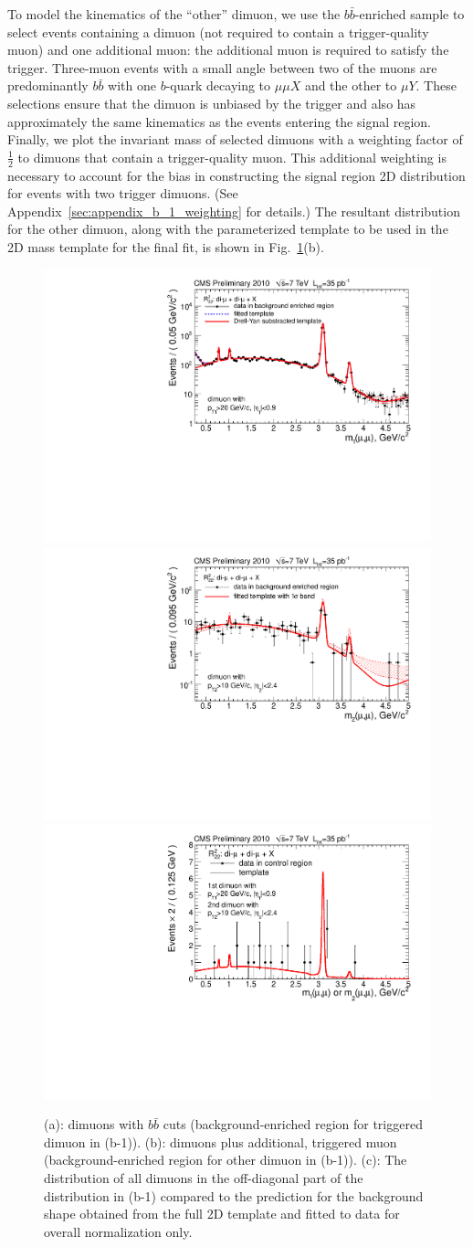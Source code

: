 To model the kinematics of the ``other'' dimuon, we use the $b\bar{b}$-enriched
sample to select events containing a dimuon (not required to contain a
trigger-quality muon) and one additional muon: the additional muon is
required to satisfy the trigger.  Three-muon events with a small angle
between two of the muons are predominantly $b\bar{b}$ with one
$b$-quark decaying to $\mu\mu X$ and the other to $\mu Y$. These
selections ensure that the dimuon is unbiased by the trigger and also
has approximately the same kinematics as the events entering the
signal region. Finally, we plot the invariant mass of selected dimuons
with a weighting factor of $\tfrac{1}{2}$ to dimuons that contain a
trigger-quality muon. This additional weighting is necessary to
account for the bias in constructing the signal region 2D distribution
for events with two trigger dimuons.  (See
Appendix~\ref{sec:appendix_b_1_weighting}
for details.) The resultant distribution for the other
dimuon, along with the parameterized template to be used in the 2D
mass template for the final fit, is shown in
Fig.~\ref{fig:backgroundEnriched_massCF}(b).

\begin{figure}
\centering
\includegraphics[width=0.45\linewidth]{PLOTS/template__bg_sh_b1t__m_1_log.pdf}
\includegraphics[width=0.45\linewidth]{PLOTS/template__bg_sh_b1o__m_2_log.pdf}
\includegraphics[width=0.45\linewidth]{PLOTS/template_control__bkg_model_b1.pdf}
\caption{(a): dimuons with $b\bar{b}$ cuts (background-enriched
  region for triggered dimuon in (b-1)). (b): dimuons plus
  additional, triggered muon (background-enriched region for other
  dimuon in (b-1)). (c): The distribution of all dimuons in the off-diagonal part
 of the distribution in (b-1) compared to the prediction for the background shape 
 obtained from the full 2D template and fitted to data for overall normalization only.  \label{fig:backgroundEnriched_massCF}}
\end{figure}

